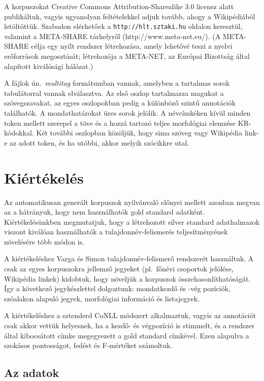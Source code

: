 \documentclass{llncs}
\begin{document}
A korpuszokat Creative Commons Attribution-Sharealike 3.0 licensz alatt publikáltuk, vagyis ugyanolyan feltételekkel adjuk tovább, ahogy a Wikipédiából letöltöttük. Szabadon elérhetőek a \texttt{http://hlt.sztaki.hu} oldalon keresztül, valamint a META-SHARE tárhelyről (http://www.meta-net.eu/). (A META-SHARE célja egy nyílt rendszer létrehozása, amely lehetővé teszi a nyelvi erőforrások megosztását; létrehozója a META-NET, az Európai Bizottság által alapított kiválósági hálózat.) 

A fájlok ún.~\emph{multitag} formátumban vannak, amelyben a tartalmas sorok tabulátorral vannak elválasztva. Az első oszlop tartalmazza magukat a szövegszavakat, az egyes oszlopokban pedig a különböző szintű annotációk találhatók. A mondathatárokat üres sorok jelölik. A névcímkéken kívül minden token mellett szerepel a töve és a hozzá tartozó teljes morfológiai elemzése KR-kódokkal. Két további oszlopban közöljük, hogy sima szöveg vagy Wikipédia link-e az adott token, és ha utóbbi, akkor melyik szócikkre utal. 

\section{Kiértékelés}
\label{results}

Az automatikusan generált korpuszok nyilvánvaló előnyei mellett azonban megvan az a hátrányuk, hogy nem használhatók gold standard adatként. Kiértékelésünkben megmutatjuk, hogy a létrehozott silver standard adathalmazok viszont kiválóan használhatók a tulajdonnév-felismerés teljesítményének növelésére több módon is. 

A kiértékeléshez Varga és Simon \cite{Varga} tulajdonnév-felismerő rendszerét használtuk. A csak az egyes korpuszokra jellemző jegyeket (pl.~főnévi csoportok jelölése, Wikipédia linkek) kidobtuk, hogy növeljük a korpuszok összehasonlíthatóságát. Így a következő jegykészlettel dolgoztunk: mondatkezdő és -vég pozíciók, szóalakon alapuló jegyek, morfológiai információ és listajegyek. 

A kiértékeléshez a sztenderd CoNLL módszert alkalmaztuk, vagyis az annotációt csak akkor vettük helyesnek, ha a kezdő- és végpozíció is stimmelt, és a rendszer által kibocsátott címke megegyezett a gold standard címkével. Ezen alapulva a szokásos pontosságot, fedést és F-mértéket számoltuk. 

\subsection{Az adatok}
\end{document}
